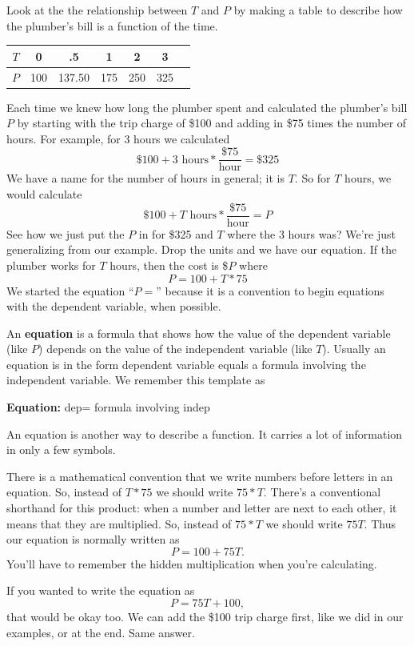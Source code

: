 Look at the the relationship between $T$ and $P$ by making a table to describe how the plumber's bill is a function of the time.
\begin{center}
\begin{tabular} {|c| |c |c |c |c |c |c |} \hline
$T$ & 0 & .5 & 1 & 2 & 3 \\ \hline
$P$ & 100 & 137.50 & 175 & 250 & 325 \\ \hline
\end{tabular}
\end{center}

Each time we knew how long the plumber spent and calculated the plumber's bill $P$ by starting with the trip charge of \$100 and adding in \$75 times the number of hours.  For example, for 3 hours we calculated
$$ \$100 + 3 \text{ hours} \ast \frac{\$75}{\text{hour}} = \$325$$
We have a name for the number of hours in general; it is $T$.  So for $T$ hours, we would calculate
 $$\$100 + T \text{ hours} \ast \frac{\$75}{\text{hour}}=P $$  
 See how we just put the $P$ in for \$325 and $T$ where the 3 hours was?  We're just generalizing from our example.  Drop the units and we have our equation.  If the plumber works for $T$ hours, then the cost is \$$P$ where 
 $$P = 100 + T \ast 75$$  
 We started the equation ``$P=$'' because it is a convention to begin equations with the dependent variable, when possible.
 
 An \textbf{equation} is a formula that shows how the value of the dependent variable (like $P$) depends on the value of the independent variable (like $T$).  Usually an equation is in the form dependent variable equals a formula involving the independent variable.  We remember this template as
 \begin{center}
\textbf{Equation:} \quad dep= formula involving indep
 \end{center}
An equation is another way to describe a function.  It carries a lot of information in only a few symbols.

There is a mathematical convention that we write numbers before letters in an equation. So, instead of $T \ast 75$ we should write $75 \ast T$.  There's a conventional shorthand for this product:  when a number and letter are next to each other, it means that they are multiplied.  So, instead of $75 * T$ we should write $75T$. Thus our equation is normally written as $$P = 100 + 75T.$$  You'll have to remember the hidden multiplication when you're calculating.  

If you wanted to write the equation as $$P = 75T + 100,$$ that would be okay too.  We can add the \$100 trip charge first, like we did in our examples, or at the end.  Same answer.

